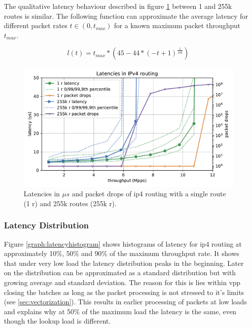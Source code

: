 The qualitative latency behaviour described in figure
\ref{graph:latencyoverview} between 1 and 255k routes is similar. The
following function can approximate the average latency for different
packet rates $t \in (0, t_{max})$ for a known maximum packet
throughput $t_{max}$. 

$$ l(t) = t_{max} * (45- 44 * (-t+1)^{\frac{1}{10t}}) $$ 



\begin{figure}[!ht]
\noindent\hspace{0.5mm}\includegraphics[width=\linewidth]{pics/latencies_per_throughput_summary_ip4.pdf}
\caption{Latencies in $\mu s$ and packet drops of \Ac{ip4} routing with a single route (1 r) and 255k routes (255k r). }
\label{graph:latencyoverview}
\end{figure}

\subsubsection{Latency Distribution}

Figure \ref{graph:latencyhistogram} shows histograms of latency for
\Ac{ip4} routing at approximately 10\%, 50\% and 90\% of the maximum
throughput rate. It shows that under very low load the latency
distribution peaks in the beginning. Later on the distribution can be
approximated as a standard distribution but with growing average and
standard deviation. The reason for this is lies within \Ac{vpp}
closing the batches as long as the packet processing is not stressed
to it's limits (see \ref{sec:vectorization}). This results in earlier
processing of packets at low loads and explains why at 50\% of the
maximum load the latency is the same, even though the lookup load is
different. \cite{linguaglossa2017high}


